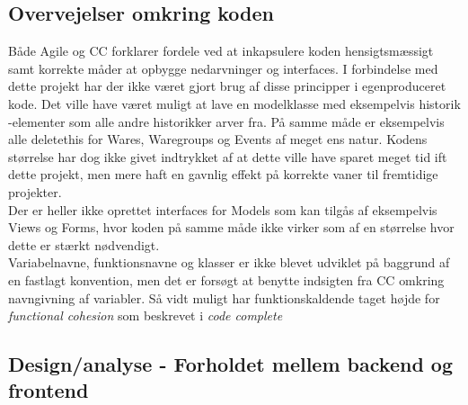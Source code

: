 \documentclass[]{article}
\begin{document}
\subsection{Overvejelser omkring koden}

Både Agile og CC \cite{martin2006agile,boswell2011art} forklarer fordele ved at inkapsulere koden hensigtsmæssigt samt korrekte måder at opbygge nedarvninger og interfaces. I forbindelse med dette projekt har der ikke været gjort brug af disse principper i egenproduceret kode. Det ville have været muligt at lave en modelklasse med eksempelvis historik -elementer som alle andre historikker arver fra. På samme måde er eksempelvis alle deletethis for Wares, Waregroups og Events af meget ens natur. Kodens størrelse har dog ikke givet indtrykket af at dette ville have sparet meget tid ift dette projekt, men mere haft en gavnlig effekt på korrekte vaner til fremtidige projekter. \\
\indent Der er heller ikke oprettet interfaces for Models som kan tilgås af eksempelvis Views og Forms, hvor koden på samme måde ikke virker som af en størrelse hvor dette er stærkt nødvendigt.\\
\indent Variabelnavne, funktionsnavne og klasser er ikke blevet udviklet på baggrund af en fastlagt konvention, men det er forsøgt at benytte indsigten fra CC \cite{boswell2011art} omkring navngivning af variabler. Så vidt muligt har funktionskaldende taget højde for \textit{functional cohesion} som beskrevet i \textit{code complete} 

\subsection{Design/analyse - Forholdet mellem backend og frontend}
\end{document}
